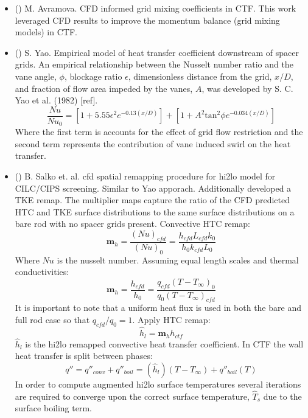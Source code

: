 
\begin{itemize}
    \item (\checkmark) M. Avramova.  CFD informed grid mixing coefficients in CTF.  This work leveraged CFD results to improve the momentum balance (grid mixing models) in CTF. \cite{avramova2007}
    \item (\checkmark) S. Yao.  Empirical model of heat transfer coefficient downstream of spacer grids. \cite{yao82}
    An empirical relationship between the Nusselt number ratio and the vane angle, $\phi$, blockage ratio $\epsilon$, dimensionless distance from the grid, $x/D$, and fraction of flow area impeded by the vanes, $A$, was developed by S. C. Yao et al. (1982) [ref].
\begin{equation}
\frac{Nu}{Nu_0}  = \left[ 1 + 5.55 \epsilon^2 e^{-0.13(x/D)}\right] + \left[ 1 + A^2\mathrm{tan}^2\phi e^{-0.034(x/D)} \right]
\end{equation}
Where the first term is accounts for the effect of grid flow restriction and the second term represents the contribution of vane induced swirl on the heat transfer.

    \item (\checkmark) B. Salko et. al. cfd spatial remapping procedure for hi2lo model for CILC/CIPS screening. \cite{salko17}
    Similar to Yao apporach.  Additionally developed a TKE remap.
    The multiplier maps capture the ratio of the CFD predicted HTC and TKE surface distributions to the same surface distributions on a bare rod with no spacer grids present.
    Convective HTC remap:
    \begin{equation}
        \mathbf m_h = \frac{(Nu)_{cfd}}{(Nu)_{0}} = \frac{h_{cfd} L_{cfd} k_{0} }{h_{0}k_{cfd} L_{0}}
    \end{equation}
    Where $Nu$ is the nusselt number.  Assuming equal length scales and thermal conductivities:
    \begin{equation}
        \mathbf m_h = \frac{h_{cfd}}{h_{0}} = \frac{q_{cfd}(T-T_\infty)_{0}}{q_{0}(T-T_\infty)_{cfd}}
    \end{equation}
    It is important to note that a uniform heat flux is used in both the bare and full rod case so that $q_{cfd}/q_0 =1 $.
    Apply HTC remap:
    \begin{equation}
        \hat h_{l} = \mathbf m_h h_{ctf}
    \end{equation}
    $\hat h_l$ is the hi2lo remapped convective heat transfer coefficient.  In CTF the wall heat transfer is split between phases:
    \begin{equation}
        q'' = q''_{conv} + q''_{boil} = (\hat h_l)(T-T_{\infty}) + q''_{boil}(T)
    \end{equation}
    In order to compute augmented hi2lo surface temperatures
    several iterations are required to converge upon the correct surface temperature, $\hat T_s$ due to the surface boiling term.


\end{itemize}

